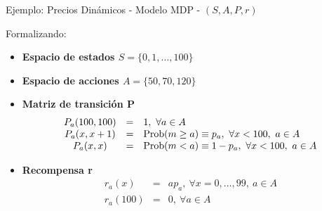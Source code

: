 \documentclass[xcolor=dvipsnames]{beamer}
\begin{document}
\begin{frame}{Ejemplo: Precios Dinámicos - Modelo MDP - $(S,A,P,r)$}

Formalizando:
\begin{itemize}
\item<2-> {\bf Espacio de estados $S = \{0,1,\dots,100\}$}
\item<3-> {\bf Espacio de acciones $A = \{50, 70, 120\}$}
\item<4-> {\bf Matriz de transición P} 
$$
\begin{array}{ccl}
P_a(100,100) & = & 1, ~\forall a \in A \\
P_a(x,x+1) & = & {\rm Prob}(m\geq a) \equiv p_a,~\forall x<100,~a \in A \\
P_a(x,x) & = & {\rm Prob}(m<a) \equiv 1-p_a,~\forall x<100,~a \in A  
\end{array}
$$

\item<5-> {\bf Recompensa r} 
$$
\begin{array}{ccl}
r_a(x) &=& a p_a,~\forall x=0,\dots,99,~a \in A\\
r_a(100) & = & 0,~\forall a \in A
\end{array}
$$
\end{itemize}
\end{frame}



%
%    
%
\end{document}
